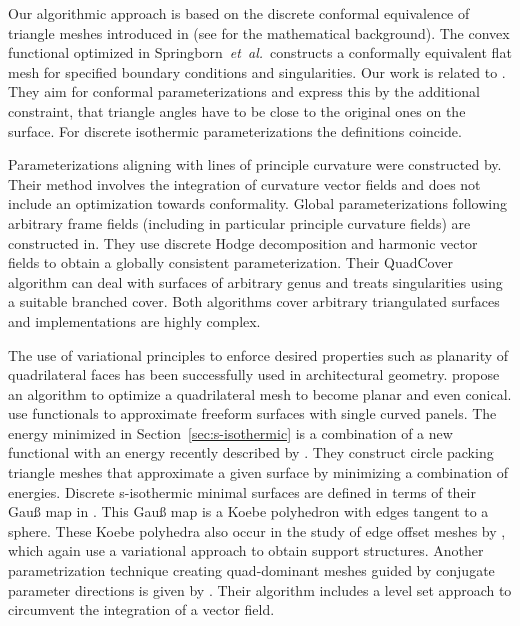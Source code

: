 \documentclass[Thesis.tex]{subfiles}
\begin{document}
Our algorithmic approach is based on the discrete conformal equivalence of
triangle meshes introduced in \cite{Springborn2008} (see
\cite{Bobenko2010} for the mathematical background). The
convex functional optimized in Springborn~\emph{et~al.}\ constructs a conformally
equivalent flat mesh for specified boundary conditions and singularities. 
Our work is related to \cite{Sheffer2001}. They aim for conformal parameterizations 
and express this by the additional constraint, that triangle angles have to be close 
to the original ones on the surface. For discrete isothermic parameterizations 
the definitions coincide.

Parameterizations aligning with lines of principle curvature were constructed
by\cite{AlliezCDLD2003}. Their method involves the integration of curvature vector fields
and does not include an optimization towards conformality. 
Global parameterizations following arbitrary frame fields 
(including in particular principle curvature fields) are constructed
in\cite{KalbererNP2007}. They use discrete Hodge decomposition and
harmonic vector fields to obtain a globally consistent parameterization. Their
QuadCover algorithm can deal with surfaces of arbitrary genus and treats
singularities using a suitable branched cover.
Both algorithms cover arbitrary triangulated surfaces and implementations are
highly complex.

The use of variational principles to enforce desired properties such as planarity of 
quadrilateral faces has been successfully used in architectural geometry.
\cite{LiuPWYW2006} propose an algorithm to optimize a quadrilateral mesh to
become planar and even conical. \cite{PottmannSBSWBW2008} use functionals to
approximate freeform surfaces with single curved panels. The energy minimized in
Section~\ref{sec:s-isothermic} is a combination of a new functional with an
energy recently described by \cite{SchiftnerHWP2009}. They construct circle
packing triangle meshes that approximate a given surface by minimizing a
combination of energies. Discrete s-isothermic minimal surfaces are defined in
terms of their Gau{\ss} map in \cite{BobHofSpr06}. This Gau{\ss} map is a Koebe
polyhedron with edges tangent to a sphere. These Koebe polyhedra also occur in
the study of edge offset meshes by \cite{PottmannLWB2007}, which again use a
variational approach to obtain support structures. Another parametrization
technique creating quad-dominant meshes guided by conjugate parameter
directions is given by \cite{ZadravecSW2010}. Their algorithm includes a level
set approach to circumvent the integration of a vector field.
\end{document}
